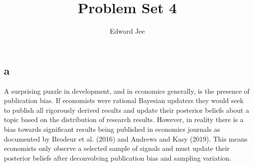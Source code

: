 \documentclass{article}
\author{Edward Jee}
\title{Problem Set 4}
\begin{document}
\maketitle


\subsection*{a}
A surprising puzzle in development, and in economics generally, is the presence 
of publication bias. If economists were rational Bayesian updaters they would 
seek to publish all rigorously derived results and update their posterior beliefs 
about a topic based on the distribution of research results. However, in reality 
there is a bias towards significant results being published in economics journals 
as documented by Brodeur et al. (2016) and Andrews and Kasy (2019). This means 
economists only observe a selected sample of signals and must update their posterior 
beliefs after deconvolving publication bias and sampling variation.




    
\end{document}
